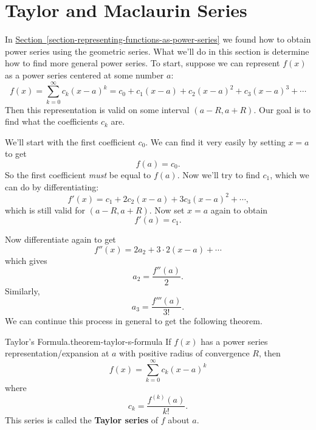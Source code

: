 \documentclass[10pt,]{book}
\newcommand{\terminology}[1]{\textbf{#1}}
\numberwithin{equation}{section}
\begin{document}
\section[{Taylor and Maclaurin Series}]{Taylor and Maclaurin Series}\label{section-taylor-and-maclaurin-series}
\hypertarget{p-959}{}%
In \hyperref[section-representing-functions-as-power-series]{Section~\ref{section-representing-functions-as-power-series}} we found how to obtain power series using the geometric series. What we'll do in this section is determine how to find more general power series. To start, suppose we can represent \(f(x)\) as a power series centered at some number \(a\):%
\begin{equation*}
f(x) = \sum_{k=0}^{\infty}c_{k}(x - a)^{k} = c_{0} + c_{1}(x - a) + c_{2}(x - a)^{2} + c_{3}(x - a)^{3} + \cdots
\end{equation*}
Then this representation is valid on some interval \((a - R, a + R)\). Our goal is to find what the coefficients \(c_{k}\) are.%
\par
\hypertarget{p-960}{}%
We'll start with the first coefficient \(c_{0}\). We can find it very easily by setting \(x = a\) to get%
\begin{equation*}
f(a) = c_{0}\text{.}
\end{equation*}
So the first coefficient \emph{must} be equal to \(f(a)\). Now we'll try to find \(c_{1}\), which we can do by differentiating:%
\begin{equation*}
f'(x) = c_{1} + 2c_{2}(x - a) + 3c_{3}(x - a)^{2} + \cdots\text{,}
\end{equation*}
which is still valid for \((a - R, a + R)\). Now set \(x = a\) again to obtain%
\begin{equation*}
f'(a) = c_{1}\text{.}
\end{equation*}
%
\par
\hypertarget{p-961}{}%
Now differentiate again to get%
\begin{equation*}
f''(x) = 2a_{2} + 3\cdot2(x - a) + \cdots
\end{equation*}
which gives%
\begin{equation*}
a_{2} = \frac{f''(a)}{2}\text{.}
\end{equation*}
Similarly,%
\begin{equation*}
a_{3} = \frac{f'''(a)}{3!}\text{.}
\end{equation*}
We can continue this process in general to get the following theorem.%
\begin{theorem}{Taylor's Formula.}{}{theorem-taylor-s-formula}%
\hypertarget{p-962}{}%
If \(f(x)\) has a power series representation/expansion at \(a\) with positive radius of convergence \(R\), then%
\begin{equation*}
f(x) = \sum_{k=0}^{\infty}c_{k}(x - a)^{k}
\end{equation*}
where%
\begin{equation*}
c_{k} = \frac{f^{(k)}(a)}{k!}\text{.}
\end{equation*}
This series is called the \terminology{Taylor series} of \(f\) about \(a\).%
\end{theorem}
\end{document}
